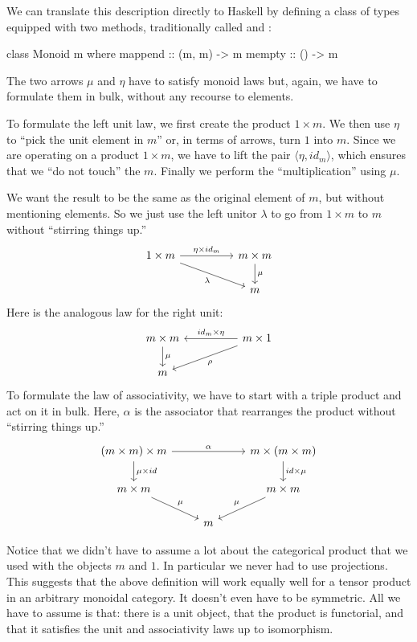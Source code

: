 \documentclass[DaoFP]{subfiles}
\begin{document}
We can translate this description directly to Haskell by defining a class of types equipped with two methods, traditionally called  and :
\begin{haskell}
class Monoid m where
  mappend :: (m, m) -> m
  mempty  :: () -> m
\end{haskell}

The two arrows $\mu$ and $\eta$ have to satisfy monoid laws but, again, we have to formulate them in bulk, without any recourse to elements.

To formulate the left unit law, we first create the product $1 \times m$. We then use $\eta$ to ``pick the unit element in $m$'' or, in terms of arrows, turn $1$ into $m$. Since we are operating on a product $1 \times m$, we have to lift the pair $\langle \eta, id_m \rangle$, which ensures that we ``do not touch'' the $m$. Finally we perform the ``multiplication'' using $\mu$. 

We want the result to be the same as the original element of $m$, but without mentioning elements. So we just use the left unitor $\lambda$ to go from $1 \times m$ to $m$ without ``stirring things up.''
\[
 \begin{tikzcd}
 1 \times m
 \arrow[rr, "\eta \times id_m"]
 \arrow[rrd, "\lambda"']
& & m \times m
 \arrow[d, "\mu"]
 \\
 && m
  \end{tikzcd}
\]
Here is the analogous law for the right unit:
\[
 \begin{tikzcd}
 m \times m
 \arrow[d, "\mu"]
 && m \times 1
 \arrow[ll, "id_m \times \eta"']
 \arrow[lld, "\rho"]
 \\
 m
 \end{tikzcd}
\]
To formulate the law of associativity, we have to start with a triple product and act on it in bulk. Here, $\alpha$ is the associator that rearranges the product without ``stirring things up.''
\[
 \begin{tikzcd}
 (m \times m) \times m 
 \arrow[rr, "\alpha"]
 \arrow[d, "\mu \times id"]
 &&
 m \times (m \times m)
 \arrow[d, "id \times \mu"]
 \\
 m \times m 
 \arrow[dr, "\mu"]
& & m \times m
 \arrow[dl, "\mu"']
 \\
&  m
 \end{tikzcd}
\]

Notice that we didn't have to assume a lot about the categorical product that we used with the objects $m$ and $1$. In particular we never had to use projections. This suggests that the above definition will work equally well for a tensor product in an arbitrary monoidal category. It doesn't even have to be symmetric. All we have to assume is that: there is a unit object, that the product is functorial, and that it satisfies the unit and associativity laws up to isomorphism.
\end{document}
